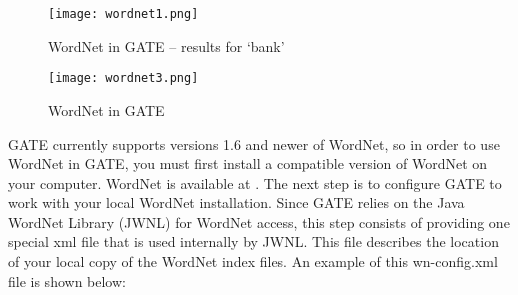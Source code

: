 %
\begin{figure}[htb]
\begin{center}
\texttt{[image: wordnet1.png]}
\end{center}
\caption{WordNet in GATE -- results for `bank'}
\label{fig:wordnet1}
\end{figure}
%
%
\begin{figure}
\begin{center}
\texttt{[image: wordnet3.png]}
\end{center}
\caption{WordNet in GATE}
\label{fig:wordnet3}
\end{figure}
%
GATE currently supports versions 1.6 and newer of WordNet, so in order to use
WordNet in GATE, you must first install a compatible version of WordNet on your
computer. WordNet is available at
. The next step is to
configure GATE to work with your local WordNet installation. Since
GATE relies on the Java WordNet Library (JWNL) for WordNet access,
this step consists of providing one special xml file that is used
internally by JWNL. This file describes the location of your local
copy of the WordNet index files. An example of this wn-config.xml
file is shown below:

